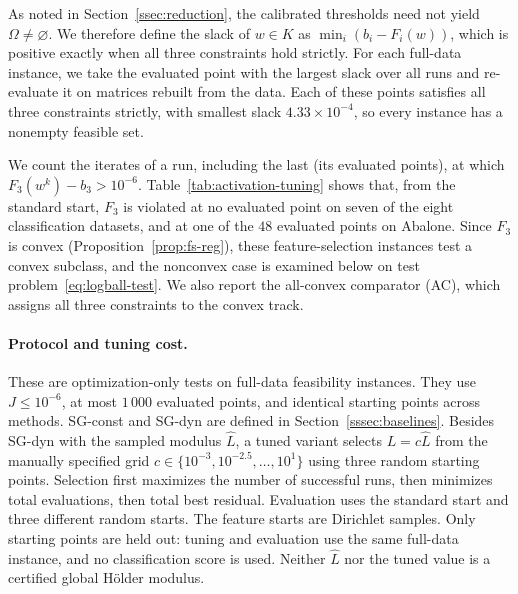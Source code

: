 \documentclass[]{interact}
\theoremstyle{plain}
\theoremstyle{definition}
\theoremstyle{remark}
\begin{document}
As noted in Section~\ref{ssec:reduction}, the calibrated thresholds need not yield $\Omega\ne\varnothing$. We therefore define the slack of $w\in K$ as $\min_i(b_i-F_i(w))$, which is positive exactly when all three constraints hold strictly. For each full-data instance, we take the evaluated point with the largest slack over all runs and re-evaluate it on matrices rebuilt from the data. Each of these points satisfies all three constraints strictly, with smallest slack $4.33\times10^{-4}$, so every instance has a nonempty feasible set.

We count the iterates of a run, including the last (its evaluated points), at which $F_3(w^k)-b_3>10^{-6}$. Table~\ref{tab:activation-tuning} shows that, from the standard start, $F_3$ is violated at no evaluated point on seven of the eight classification datasets, and at one of the $48$ evaluated points on Abalone. Since $F_3$ is convex (Proposition~\ref{prop:fs-reg}), these feature-selection instances test a convex subclass, and the nonconvex case is examined below on test problem~\eqref{eq:logball-test}. We also report the all-convex comparator (AC), which assigns all three constraints to the convex track.

\paragraph*{Protocol and tuning cost.}
These are optimization-only tests on full-data feasibility instances. They use $J\le10^{-6}$, at most $1\,000$ evaluated points, and identical starting points across methods. SG-const and SG-dyn are defined in Section~\ref{sssec:baselines}. Besides SG-dyn with the sampled modulus $\widehat L$, a tuned variant selects $L=c\widehat L$ from the manually specified grid $c\in\{10^{-3},10^{-2.5},\ldots,10^1\}$ using three random starting points. Selection first maximizes the number of successful runs, then minimizes total evaluations, then total best residual. Evaluation uses the standard start and three different random starts. The feature starts are Dirichlet samples. Only starting points are held out: tuning and evaluation use the same full-data instance, and no classification score is used. Neither $\widehat L$ nor the tuned value is a certified global H\"older modulus.
\end{document}
